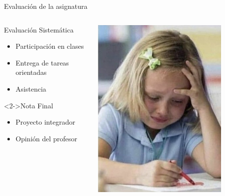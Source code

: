 \begin{frame}{Evaluaci\'on de la asignatura}
    \begin{columns}[T]
        \begin{column}{0.40\linewidth}
            \begin{block}{Evaluaci\'on Sistem\'atica}
        
                \begin{itemize}
                    \item Participaci\'on en clases
                    \item Entrega de tareas orientadas
                    \item Asistencia
                \end{itemize}
            \end{block}    
            \vspace{10pt}
            \begin{block}<2->{Nota Final}
                
                \begin{itemize}
                    \item Proyecto integrador
                    \item Opini\'on del profesor
                \end{itemize}
            \end{block}
        \end{column}
        
        \begin{column}{0.58\linewidth}
            \includegraphics[width=0.8\textwidth, height=0.8\textheight]{img/eval.jpg}
        \end{column}
    \end{columns}

   
\end{frame}